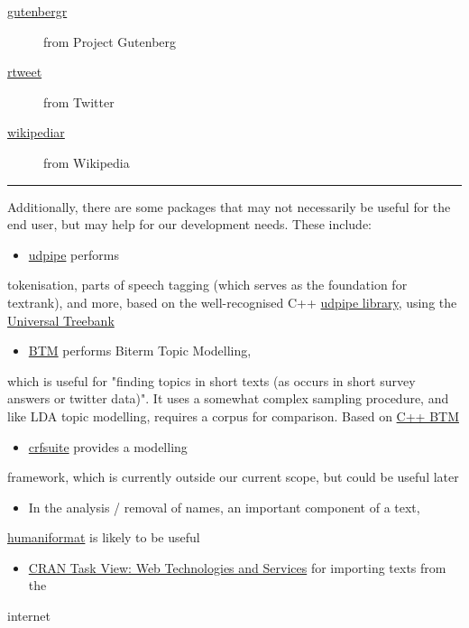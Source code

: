 \documentclass[11pt]{article}
\begin{document}
\begin{description}
\begin{description}
\item[{\href{https://cran.r-project.org/web/packages/gutenbergr/index.html}{gutenbergr}}] from Project Gutenberg
\item[{\href{https://rtweet.info/}{rtweet}}] from Twitter
\item[{\href{https://cran.r-project.org/web/packages/WikipediaR/index.html}{wikipediar}}] from Wikipedia
\end{description}
\end{description}

\noindent\rule{\textwidth}{0.5pt}

Additionally, there are some packages that may not necessarily be useful
for the end user, but may help for our development needs. These
include:
\begin{itemize}
\item \href{https://github.com/bnosac/udpipe}{udpipe} performs
\end{itemize}
tokenisation, parts of speech tagging (which serves as the foundation
for textrank), and more, based on the well-recognised C++
\href{http://ufal.mff.cuni.cz/udpipe}{udpipe library}, using the \href{https://universaldependencies.org}{Universal Treebank}
\begin{itemize}
\item \href{https://github.com/bnosac/BTM}{BTM} performs Biterm Topic Modelling,
\end{itemize}
which is useful for "finding topics in short texts (as occurs in short
survey answers or twitter data)". It uses a somewhat complex sampling
procedure, and like LDA topic modelling, requires a corpus for
comparison. Based on \href{https://github.com/xiaohuiyan/BTM}{C++ BTM} 
\begin{itemize}
\item \href{https://github.com/bnosac/crfsuite}{crfsuite} provides a modelling
\end{itemize}
framework, which is currently outside our current scope, but could be
useful later 
\begin{itemize}
\item In the analysis / removal of names, an important component of a text,
\end{itemize}
\href{https://github.com/ironholds/humaniformat/}{humaniformat} is likely to be useful
\begin{itemize}
\item \href{https://cran.r-project.org/web/views/WebTechnologies.html}{CRAN Task View: Web Technologies and Services} for importing texts from the
\end{itemize}
internet
\end{document}
